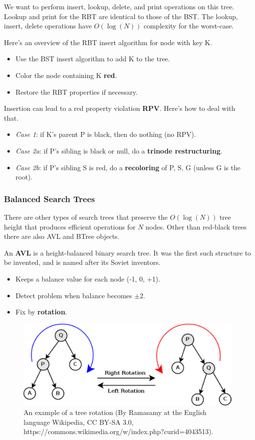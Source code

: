 We want to perform insert, lookup, delete, and print operations on this tree. Lookup and print for the RBT are identical to those of the BST. The lookup, insert, delete operations have $O(\log(N))$ complexity for the worst-case. 

Here's an overview of the RBT insert algorithm for node with key K. 

\begin{itemize}
	\item Use the BST insert algorithm to add K to the tree.
	\item Color the node containing K \textbf{red}.
	\item Restore the RBT properties if necessary.
\end{itemize}

Insertion can lead to a red property violation \textbf{RPV}. Here's how to deal with that. 

\begin{itemize}
	\item \textit{Case 1}: if K's parent P is black, then do nothing (no RPV). 
	\item \textit{Case 2a}: if P's sibling is black or null, do a \textbf{trinode restructuring}. 
	\item \textit{Case 2b}: if P's sibling S is red, do a \textbf{recoloring} of P, S, G (unless G is the root). 
\end{itemize}

\subsubsection{Balanced Search Trees}

There are other types of search trees that preserve the $O(\log(N))$ tree height that produces efficient operations for $N$ nodes. Other than red-black trees there are also AVL and BTree objects. 

An \textbf{AVL} is a height-balanced binary search tree. It was the first such structure to be invented, and is named after its Soviet inventors. 
\begin{itemize}
	\item Keeps a balance value for each node (-1, 0, +1).
	\item Detect problem when balance becomes $\pm 2$. 
	\item Fix by \textbf{rotation}. 
\end{itemize}

\begin{figure}[tb]
\centering
\includegraphics[width=0.75\columnwidth]{Figures/Tree_rotation.pdf}
\caption{An example of a tree rotation (By Ramasamy at the English language Wikipedia, CC BY-SA 3.0, https://commons.wikimedia.org/w/index.php?curid=4043513).}
\label{fig:rotation}
\end{figure}

